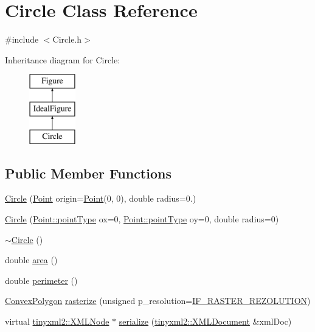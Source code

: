 \hypertarget{class_circle}{}\section{Circle Class Reference}
\label{class_circle}


{\ttfamily \#include $<$Circle.\+h$>$}

Inheritance diagram for Circle\+:\begin{figure}[H]
\begin{center}
\leavevmode
\includegraphics[height=3.000000cm]{class_circle}
\end{center}
\end{figure}
\subsection*{Public Member Functions}
\begin{DoxyCompactItemize}
\item 
\hyperlink{class_circle_a555b78514051debac82915e25ee37245}{Circle} (\hyperlink{class_point}{Point} origin=\hyperlink{class_point}{Point}(0, 0), double radius=0.)
\item 
\hyperlink{class_circle_ae12be199f60ebd4fa356047faec83818}{Circle} (\hyperlink{class_point_a00b37528c0db634a12ecee9b29d79579}{Point\+::point\+Type} ox=0, \hyperlink{class_point_a00b37528c0db634a12ecee9b29d79579}{Point\+::point\+Type} oy=0, double radius=0)
\item 
\hyperlink{class_circle_ae3f30436e645d73e368e8ee55f8d1650}{$\sim$\+Circle} ()
\item 
double \hyperlink{class_circle_a4f31d14f360b6e1f1acfb283ad65145a}{area} ()
\item 
double \hyperlink{class_circle_ab0a4db4a814591918b0372feac5df46b}{perimeter} ()
\item 
\hyperlink{class_convex_polygon}{Convex\+Polygon} \hyperlink{class_circle_ae5f140e34baceae51bb662bc15a5cecc}{rasterize} (unsigned p\+\_\+resolution=\hyperlink{_ideal_figure_8h_a00d8c937c01b3a24f12056a00144690b}{I\+F\+\_\+\+R\+A\+S\+T\+E\+R\+\_\+\+R\+E\+Z\+O\+L\+U\+T\+I\+ON})
\item 
virtual \hyperlink{classtinyxml2_1_1_x_m_l_node}{tinyxml2\+::\+X\+M\+L\+Node} $\ast$ \hyperlink{class_circle_a86fa86f49342a310db5e717c75011487}{serialize} (\hyperlink{classtinyxml2_1_1_x_m_l_document}{tinyxml2\+::\+X\+M\+L\+Document} \&xml\+Doc)
\end{DoxyCompactItemize}

